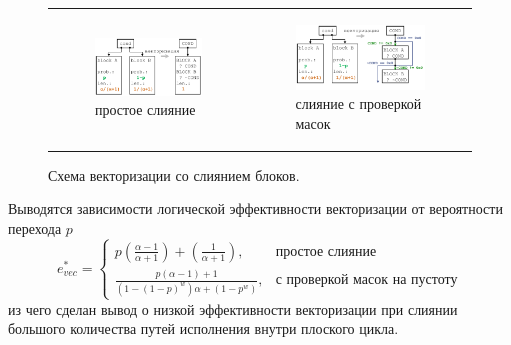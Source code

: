 \documentclass[a4paper,14pt]{extarticle}                     %
\theoremstyle{plain}                                         %
\begin{document}
\begin{figure}[!ht]
\centering
\begin{tabular}{ll}
\begin{subfigure}{0.45\textwidth}\centering\includegraphics[width=0.85\columnwidth]{./fig/vec_ifconv_nocheck_big.pdf}\caption{простое слияние}\end{subfigure} &
\begin{subfigure}{0.45\textwidth}\centering\includegraphics[width=0.85\columnwidth]{./fig/vec_ifconv_check_big.pdf}\caption{слияние с проверкой масок}\end{subfigure}
\end{tabular}
\singlespacing
\caption{Схема векторизации со слиянием блоков.}
\label{fig:vec_ifconv_nocheck_check}
\end{figure}

Выводятся зависимости логической эффективности векторизации от вероятности перехода $p$
\begin{equation*}
e_{vec}^{*} =
	\begin{cases}
		p\left(\frac{\alpha - 1}{\alpha + 1}\right) + \left(\frac{1}{\alpha + 1}\right), & \text{простое слияние} \\
		\frac{ p(\alpha - 1) + 1 }{\left(1 - (1 - p)^w\right) \alpha + (1 - p^w)},       & \text{с проверкой масок на пустоту}
	\end{cases}
\end{equation*}
из чего сделан вывод о низкой эффективности векторизации при слиянии большого количества путей исполнения внутри плоского цикла.
\end{document}
